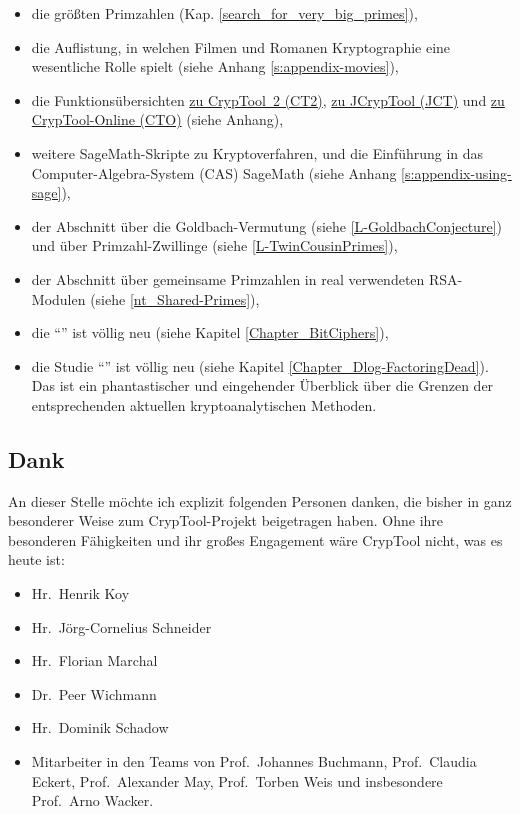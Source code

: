 \begin{itemize}
  \item die größten Primzahlen (Kap. \ref{search_for_very_big_primes}), 
  \item die Auflistung, in welchen Filmen und Romanen Kryptographie eine wesentliche Rolle spielt (siehe Anhang \ref{s:appendix-movies}),
  \item die Funktionsübersichten \hyperlink{appendix-template-overview-CT2}{zu CrypTool~2 (CT2)}, \hyperlink{appendix-function-overview-JCT}{zu JCrypTool (JCT)} und \hyperlink{appendix-function-overview-CTO}{zu CrypTool-Online (CTO)} (siehe Anhang),
  \item weitere SageMath-Skripte zu Kryptoverfahren, und die Einführung in das Computer-Algebra-System (CAS) SageMath (siehe
        Anhang \ref{s:appendix-using-sage}),
  \item der Abschnitt über die Goldbach-Vermutung (siehe \ref{L-GoldbachConjecture}) und über Primzahl-Zwillinge (siehe \ref{L-TwinCousinPrimes}),
  \item der Abschnitt über gemeinsame Primzahlen in real verwendeten RSA-Modulen (siehe \ref{nt_Shared-Primes}),
  \item die \enquote{} ist völlig neu (siehe Kapitel \ref{Chapter_BitCiphers}),
  \item die Studie \enquote{} ist völlig neu
	(siehe Kapitel \ref{Chapter_Dlog-FactoringDead}). Das ist ein
	phantastischer und eingehender Überblick über die Grenzen der
	entsprechenden aktuellen kryptoanalytischen Methoden.
\end{itemize}

\subsection*{Dank}

An dieser Stelle möchte ich explizit folgenden Personen danken, die bisher in ganz besonderer Weise zum CrypTool-Projekt beigetragen haben.
Ohne ihre besonderen Fähigkeiten und ihr großes Engagement wäre CrypTool nicht, was es heute ist:

\begin{itemize}   
\item Hr.\ Henrik Koy
   \item Hr.\ Jörg-Cornelius Schneider
   \item Hr.\ Florian Marchal
   \item Dr.\ Peer Wichmann
   \item Hr.\ Dominik Schadow
   \item Mitarbeiter in den Teams von
         Prof.\ Johannes Buchmann,
         Prof.\ Claudia Eckert,
         Prof.~Alexander May,
         Prof.~Torben Weis und insbesondere
         Prof.\ Arno Wacker.
\end{itemize}

